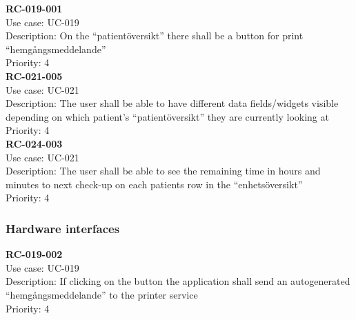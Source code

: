 \textbf{RC-019-001} \\
Use case: UC-019 \\
Description: On the “patientöversikt” there shall be a button for print “hemgångsmeddelande”  \\
Priority: 4 \\
\newline
\textbf{RC-021-005} \\
Use case: UC-021 \\
Description: The user shall be able to have different data fields/widgets visible depending on which patient’s “patientöversikt” they are currently looking at  \\
Priority: 4 \\
\newline
\textbf{RC-024-003} \\
Use case: UC-021 \\
Description: The user shall be able to see the remaining time in hours and minutes to next check-up on each patients row in the “enhetsöversikt”  \\
Priority: 4 \\
\newline
\subsubsection{ Hardware interfaces}
\textbf{RC-019-002} \\
Use case: UC-019 \\
Description: If clicking on the button the application shall send an autogenerated “hemgångsmeddelande” to the printer service  \\
Priority: 4 \\
\newline
